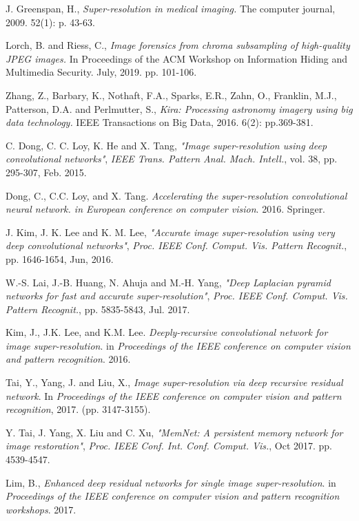 \documentclass[journal]{IEEEtran}
\begin{document}
\begin{thebibliography}{00}

 J. Greenspan, H., \textit{Super-resolution in medical imaging.} The computer journal, 2009. 52(1): p. 43-63.

 Lorch, B. and Riess, C., \textit{Image forensics from chroma subsampling of high-quality JPEG images.} In Proceedings of the ACM Workshop on Information Hiding and Multimedia Security. July, 2019. pp. 101-106.

 Zhang, Z., Barbary, K., Nothaft, F.A., Sparks, E.R., Zahn, O., Franklin, M.J., Patterson, D.A. and Perlmutter, S.,  \textit{Kira: Processing astronomy imagery using big data technology.} IEEE Transactions on Big Data, 2016. 6(2): pp.369-381.

 C. Dong, C. C. Loy, K. He and X. Tang, \textit{"Image super-resolution using deep convolutional networks"}, \textit{IEEE Trans. Pattern Anal. Mach. Intell.}, vol. 38, pp. 295-307, Feb. 2015.

 Dong, C., C.C. Loy, and X. Tang. \textit{Accelerating the super-resolution convolutional neural network. in European conference on computer vision}. 2016. Springer.

 J. Kim, J. K. Lee and K. M. Lee, \textit{"Accurate image super-resolution using very deep convolutional networks"}, \textit{Proc. IEEE Conf. Comput. Vis. Pattern Recognit.}, pp. 1646-1654, Jun, 2016.

 W.-S. Lai, J.-B. Huang, N. Ahuja and M.-H. Yang, \textit{"Deep Laplacian pyramid networks for fast and accurate super-resolution"}, \textit{Proc. IEEE Conf. Comput. Vis. Pattern Recognit.}, pp. 5835-5843, Jul. 2017.

 Kim, J., J.K. Lee, and K.M. Lee. \textit{Deeply-recursive convolutional network for image super-resolution}. in \textit{Proceedings of the IEEE conference on computer vision and pattern recognition}. 2016.

 Tai, Y., Yang, J. and Liu, X., \textit{Image super-resolution via deep recursive residual network}. In \textit{Proceedings of the IEEE conference on computer vision and pattern recognition}, 2017. (pp. 3147-3155).

 Y. Tai, J. Yang, X. Liu and C. Xu, \textit{"MemNet: A persistent memory network for image restoration"}, \textit{Proc. IEEE Conf. Int. Conf. Comput. Vis.}, Oct 2017. pp. 4539-4547. 

 Lim, B., \textit{Enhanced deep residual networks for single image super-resolution}. in \textit{Proceedings of the IEEE conference on computer vision and pattern recognition workshops}. 2017.


\end{thebibliography}
\end{document}
